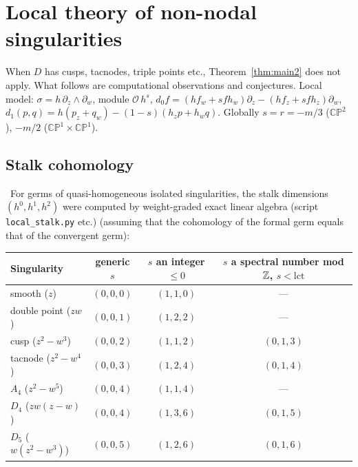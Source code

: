 \section{Local theory of non-nodal singularities}\label{sec:local}
When $D$ has cusps, tacnodes, triple points etc., Theorem~\ref{thm:main2} does not apply. What follows are computational observations and conjectures. Local model: $\sigma=h\,\partial_z\wedge\partial_w$, module $\mathcal O\,h^s$, $d_0f=(hf_w+sfh_w)\partial_z-(hf_z+sfh_z)\partial_w$, $d_1(p,q)=h(p_z+q_w)-(1-s)(h_zp+h_wq)$. Globally $s=r=-m/3$ ($\mathbb{CP}^2$), $-m/2$ ($\mathbb{CP}^1\times\mathbb{CP}^1$).

\subsection{Stalk cohomology}
\tV\ For germs of quasi-homogeneous isolated singularities, the stalk dimensions $(h^0,h^1,h^2)$ were computed by weight-graded exact linear algebra (script \texttt{local\_stalk.py} etc.) (assuming that the cohomology of the formal germ equals that of the convergent germ):
\begin{center}\small
\begin{tabular}{lccc}\toprule
Singularity & generic $s$ & $s$ an integer $\le0$ & $s$ a spectral number mod $\mathbb Z$, $s<\mathrm{lct}$\\\midrule
smooth ($z$) & $(0,0,0)$ & $(1,1,0)$ & ---\\
double point ($zw$) & $(0,0,1)$ & $(1,2,2)$ & ---\\
cusp ($z^2-w^3$) & $(0,0,2)$ & $(1,1,2)$ & $(0,1,3)$\\
tacnode ($z^2-w^4$) & $(0,0,3)$ & $(1,2,4)$ & $(0,1,4)$\\
$A_4$ ($z^2-w^5$) & $(0,0,4)$ & $(1,1,4)$ & ---\\
$D_4$ ($zw(z-w)$) & $(0,0,4)$ & $(1,3,6)$ & $(0,1,5)$\\
$D_5$ ($w(z^2-w^3)$) & $(0,0,5)$ & $(1,2,6)$ & $(0,1,6)$\\\bottomrule
\end{tabular}
\end{center}
